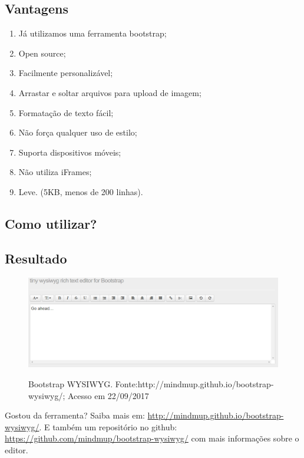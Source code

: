 \documentclass[12pt,a4paper]{article}
\begin{document}
\subsection{Vantagens}
\begin{enumerate}
\item Já utilizamos uma ferramenta bootstrap;
\item Open source;
\item Facilmente personalizável;
\item Arrastar e soltar arquivos para upload de imagem;
\item Formatação de texto fácil;
\item Não força qualquer uso de estilo; 
\item Suporta dispositivos móveis;
\item Não utiliza iFrames;
\item Leve. (5KB, menos de 200 linhas).

\end{enumerate}

\subsection{Como utilizar?}



\subsection{Resultado}
\begin{figure}[h]
\centering
\includegraphics[width=15cm]{recursos/modelo/Bootstrap.png}
\label{4}
\caption{Bootstrap WYSIWYG. Fonte:http://mindmup.github.io/bootstrap-wysiwyg/; Acesso em 22/09/2017}
\end{figure}

Gostou da ferramenta? Saiba mais em: \url{http://mindmup.github.io/bootstrap-wysiwyg/}. E também um repositório no github: \url{https://github.com/mindmup/bootstrap-wysiwyg/} com mais informações sobre o editor.
\end{document}
